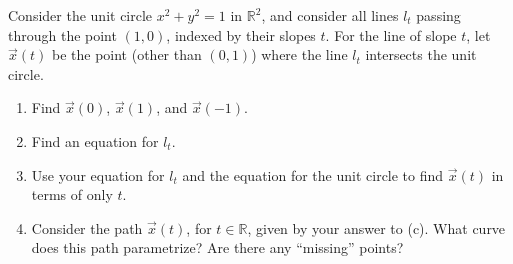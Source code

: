 \documentclass{ximera}
\begin{document}
\begin{problem}
Consider the unit circle $x^2+y^2=1$ in $\mathbb{R}^2$, and consider all lines $l_t$ passing through the point $(1,0)$, indexed by their slopes $t$. For the line of slope $t$, let $\vec{x}(t)$ be the point (other than $(0,1)$) where the line $l_t$ intersects the unit circle.
\begin{enumerate}
\item Find $\vec{x}(0)$, $\vec{x}(1)$, and $\vec{x}(-1)$.
\item Find an equation for $l_t$.
\item Use your equation for $l_t$ and the equation for the unit circle to find $\vec{x}(t)$ in terms of only $t$.
\item Consider the path $\vec{x}(t)$, for $t\in\mathbb{R}$, given by your answer to (c). What curve does this path parametrize? Are there any ``missing'' points?
\end{enumerate}
\end{problem}
\end{document}
